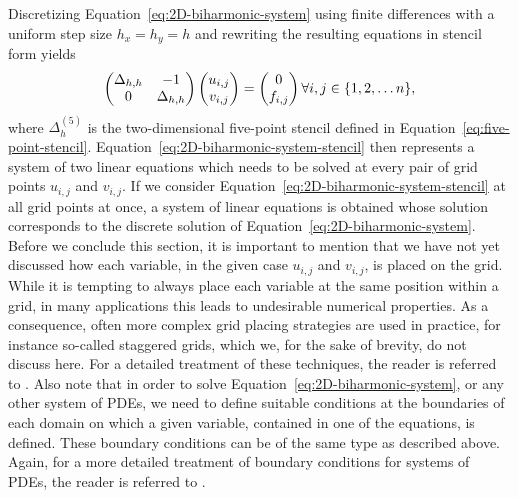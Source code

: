 Discretizing Equation~\eqref{eq:2D-biharmonic-system} using finite differences with a uniform step size $h_x = h_y = h$ and rewriting the resulting equations in stencil form yields
\begin{equation}
		\begin{pmatrix}
			\Delta_{h, h} & -1 \\
			0 & \Delta_{h, h}
	\end{pmatrix}
		\begin{pmatrix}
			u_{i,j} \\ v_{i,j}
		\end{pmatrix}
	=
		\begin{pmatrix}
			0 \\ f_{i,j}
		\end{pmatrix} \\
\forall i,j \in \{1, 2, \dots n\},
	\label{eq:2D-biharmonic-system-stencil}
\end{equation}
where $\Delta_h^{(5)}$ is the two-dimensional five-point stencil defined in Equation~\eqref{eq:five-point-stencil}.
Equation~\eqref{eq:2D-biharmonic-system-stencil} then represents a system of two linear equations which needs to be solved at every pair of grid points $u_{i,j}$ and $v_{i,j}$.
If we consider Equation~\eqref{eq:2D-biharmonic-system-stencil} at all grid points at once, a system of linear equations is obtained whose solution corresponds to the discrete solution of Equation~\eqref{eq:2D-biharmonic-system}.
Before we conclude this section, it is important to mention that we have not yet discussed how each variable, in the given case $u_{i,j}$ and $v_{i,j}$, is placed on the grid.
While it is tempting to always place each variable at the same position within a grid, in many applications this leads to undesirable numerical properties.%
As a consequence, often more complex grid placing strategies are used in practice, for instance so-called staggered grids, which we, for the sake of brevity, do not discuss here.
For a detailed treatment of these techniques, the reader is referred to %
.
Also note that in order to solve Equation~\eqref{eq:2D-biharmonic-system}, or any other system of PDEs, we need to define suitable conditions at the boundaries of each domain on which a given variable, contained in one of the equations, is defined.
These boundary conditions can be of the same type as described above.
Again, for a more detailed treatment of boundary conditions for systems of PDEs, the reader is referred to %
.
 


